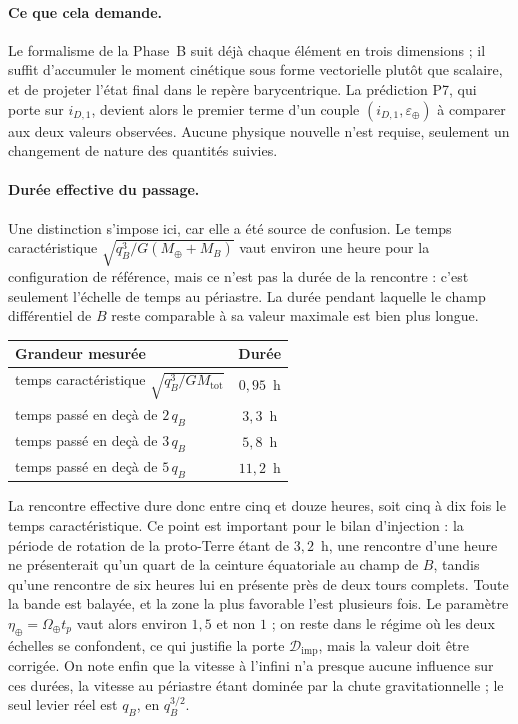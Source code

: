 \documentclass[11pt,a4paper,openany]{report}
\newcommand{\Mt}{M_{\oplus}}
\begin{document}
\paragraph{Ce que cela demande.} Le formalisme de la Phase~B suit déjà chaque élément en trois
dimensions ; il suffit d'accumuler le moment cinétique sous forme vectorielle plutôt que scalaire,
et de projeter l'état final dans le repère barycentrique. La prédiction P7, qui porte sur
$i_{D,1}$, devient alors le premier terme d'un couple $(i_{D,1},\varepsilon_\oplus)$ à comparer aux
deux valeurs observées. Aucune physique nouvelle n'est requise, seulement un changement de nature
des quantités suivies.


\paragraph{Durée effective du passage.}\label{par:duree} Une distinction s'impose ici, car elle a été source de
confusion. Le temps caractéristique $\sqrt{q_B^{3}/G(\Mt+M_B)}$ vaut environ une heure pour la
configuration de référence, mais ce n'est pas la durée de la rencontre : c'est seulement l'échelle
de temps au périastre. La durée pendant laquelle le champ différentiel de $B$ reste comparable à sa
valeur maximale est bien plus longue.

\begin{center}
\begin{tabular}{lc}
\toprule
\textbf{Grandeur mesurée} & \textbf{Durée} \\
\midrule
temps caractéristique $\sqrt{q_B^{3}/G M_{\mathrm{tot}}}$ & $0{,}95$~h \\
temps passé en deçà de $2\,q_B$ & $3{,}3$~h \\
temps passé en deçà de $3\,q_B$ & $5{,}8$~h \\
temps passé en deçà de $5\,q_B$ & $11{,}2$~h \\
\bottomrule
\end{tabular}
\end{center}

La rencontre effective dure donc entre cinq et douze heures, soit cinq à dix fois le temps
caractéristique. Ce point est important pour le bilan d'injection : la période de rotation de la
proto-Terre étant de $3{,}2$~h, une rencontre d'une heure ne présenterait qu'un quart de la
ceinture équatoriale au champ de $B$, tandis qu'une rencontre de six heures lui en présente près de
deux tours complets. Toute la bande est balayée, et la zone la plus favorable l'est plusieurs fois.
Le paramètre $\eta_\oplus=\Omega_\oplus t_{p}$ vaut alors environ $1{,}5$ et non $1$ ;
on reste dans le régime où les deux échelles se confondent, ce qui justifie la porte
$\mathcal{D}_{\mathrm{imp}}$, mais la valeur doit être corrigée. On note enfin que la vitesse à
l'infini n'a presque aucune influence sur ces durées, la vitesse au périastre étant dominée par la
chute gravitationnelle ; le seul levier réel est $q_B$, en $q_B^{3/2}$.
\end{document}
